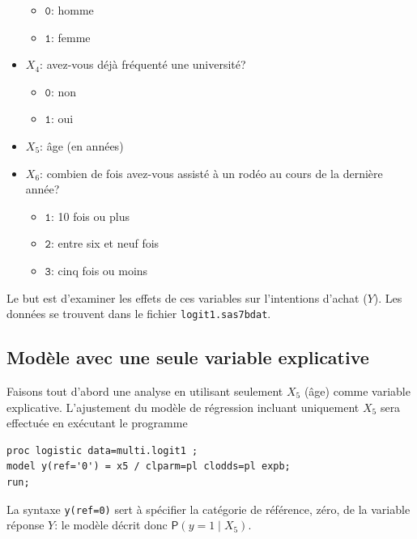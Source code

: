 \documentclass[
  11pt,
  letterpaper,
]{book}
\providecommand{\tightlist}{%
  \setlength{\itemsep}{0pt}\setlength{\parskip}{0pt}}
\theoremstyle{definition}
\theoremstyle{definition}
\theoremstyle{definition}
\theoremstyle{remark}
\begin{document}
\begin{itemize}
  \begin{itemize}
  \tightlist
  \item
    \(\texttt{0}\): homme
  \item
    \(\texttt{1}\): femme
  \end{itemize}
\item
  \(X_4\): avez-vous déjà fréquenté une université?

  \begin{itemize}
  \tightlist
  \item
    \(\texttt{0}\): non
  \item
    \(\texttt{1}\): oui
  \end{itemize}
\item
  \(X_5\): âge (en années)
\item
  \(X_6\): combien de fois avez-vous assisté à un rodéo au cours de la dernière année?

  \begin{itemize}
  \tightlist
  \item
    \(\texttt{1}\): 10 fois ou plus
  \item
    \(\texttt{2}\): entre six et neuf fois
  \item
    \(\texttt{3}\): cinq fois ou moins
  \end{itemize}
\end{itemize}

Le but est d'examiner les effets de ces variables sur l'intentions d'achat (\(Y\)). Les données se trouvent dans le fichier \texttt{logit1.sas7bdat}.

\hypertarget{moduxe8le-avec-une-seule-variable-explicative}{%
\subsection{Modèle avec une seule variable explicative}\label{moduxe8le-avec-une-seule-variable-explicative}}

Faisons tout d'abord une analyse en utilisant seulement \(X_5\) (âge) comme variable explicative. L'ajustement du modèle de régression incluant uniquement \(X_5\) sera effectuée en exécutant le programme

\begin{verbatim}
proc logistic data=multi.logit1 ;
model y(ref='0') = x5 / clparm=pl clodds=pl expb;
run;
\end{verbatim}

La syntaxe \texttt{y(ref=\textquotesingle{}0\textquotesingle{})} sert à spécifier la catégorie de référence, zéro, de la variable réponse \(Y\): le modèle décrit donc \({\mathsf P}\left(y=1 \mid X_5\right)\).
\end{document}
